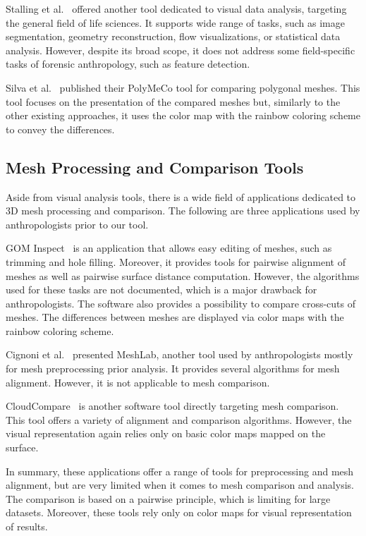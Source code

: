 \documentclass[final,5p,times]{elsarticle}
\begin{document}
Stalling et al.~\cite{stalling200538} offered another tool dedicated to visual data analysis, targeting the general field of life sciences. 
It supports wide range of tasks, such as image segmentation, geometry reconstruction, flow visualizations, or statistical data analysis.
However, despite its broad scope, it does not address some field-specific tasks of forensic anthropology, such as feature detection.

Silva et al.~\cite{Silva2005} published their PolyMeCo tool for comparing polygonal meshes. 
This tool focuses on the presentation of the compared meshes but, similarly to the other existing approaches, it uses the color map with the rainbow coloring scheme to convey the differences.

\subsection{Mesh Processing and Comparison Tools}
Aside from visual analysis tools, there is a wide field of applications dedicated to 3D mesh processing and comparison.
The following are three applications used by anthropologists prior to our tool.

GOM Inspect~\cite{GOMInsp} is an application that allows easy editing of meshes, such as trimming and hole filling. Moreover, it provides tools for pairwise alignment of meshes as well as pairwise surface distance computation. 
However, the algorithms used for these tasks are not documented, which is a major drawback for anthropologists. 
The software also provides a possibility to compare cross-cuts of meshes. 
The differences between meshes are displayed via color maps with the rainbow coloring scheme.

Cignoni et al.~\cite{meshlab} presented MeshLab, another tool used by anthropologists mostly for mesh preprocessing prior analysis. 
It provides several algorithms for mesh alignment. However, it is not applicable to mesh comparison.

CloudCompare~\cite{CCompare} is another software tool directly targeting mesh comparison. 
This tool offers a variety of alignment and comparison algorithms. However, the visual representation again relies only on basic color maps mapped on the surface.

In summary, these applications offer a range of tools for preprocessing and mesh alignment, but are very limited when it comes to mesh comparison and analysis. 
The comparison is based on a pairwise principle, which is limiting for large datasets. 
Moreover, these tools rely only on color maps for visual representation of results.
\end{document}
